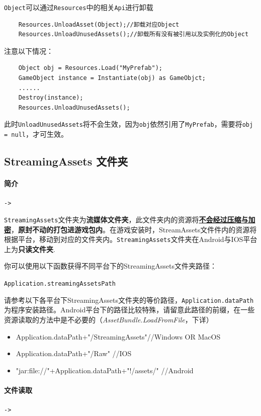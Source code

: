 \documentclass[UTF8,a4paper,12pt]{ctexbook}
\begin{document}
				\verb|Object|可以通过\verb|Resources|中的相关\verb|Api|进行卸载
					\begin{lstlisting}
	Resources.UnloadAsset(Object);//卸载对应Object 
	Resources.UnloadUnusedAssets();//卸载所有没有被引用以及实例化的Object
					\end{lstlisting}

				注意以下情况：
					\begin{lstlisting}
	Object obj = Resources.Load("MyPrefab"); 			
	GameObject instance = Instantiate(obj) as GameObjct; 
	...... 
	Destroy(instance); 
	Resources.UnloadUnusedAssets(); 
					\end{lstlisting}
					
				此时\verb|UnloadUnusedAssets|将不会生效，因为\verb|obj|依然引用了\verb|MyPrefab|，需要将\verb|obj = null|，才可生效。

		\subsection{StreamingAssets 文件夹}
			\paragraph{简介}\verb|->|
			
				\verb|StreamingAssets|文件夹为\textbf{流媒体文件夹}，此文件夹内的资源将\underline{\textbf{不会经过压缩与加密}}，\textbf{原封不动的打包进游戏包内}。在游戏安装时，StreamAssets文件件内的资源将根据平台，移动到对应的文件夹内。\verb|StreamingAssets|文件夹在Android与IOS平台上为\textbf{只读文件夹}. 
				
				你可以使用以下函数获得不同平台下的StreamingAssets文件夹路径：
				
					\verb|Application.streamingAssetsPath| 
				
				 请参考以下各平台下StreamingAssets文件夹的等价路径，\verb|Application.dataPath|为程序安装路径。Android平台下的路径比较特殊，请留意此路径的前缀，在一些资源读取的方法中是不必要的（\textit{AssetBundle.LoadFromFile}，下详）
				
					\begin{itemize}
						\item Application.dataPath+"/StreamingAssets"//Windows OR MacOS
						\item Application.dataPath+"/Raw" //IOS
						\item "jar:file://"+Application.dataPath+"!/assets/" //Android 
					\end{itemize}
				 
			\paragraph{文件读取}\verb|->|
				
\end{document}
